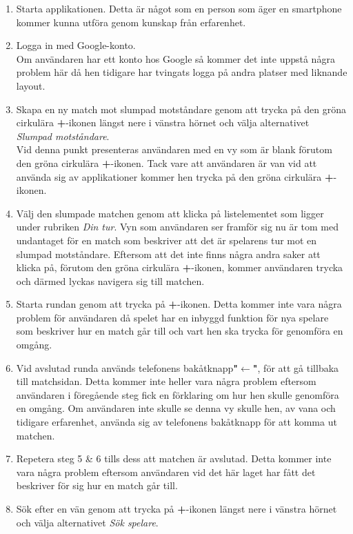 \documentclass[a4paper, 11pt]{article}
\begin{document}
\begin{enumerate}
\item Starta applikationen.
Detta är något som en person som äger en smartphone kommer kunna utföra genom kunskap från erfarenhet.
\item Logga in med Google-konto.\\ 
Om användaren har ett konto hos Google så kommer det inte uppstå några problem här då hen tidigare har tvingats logga på andra platser med liknande layout.
\item Skapa en ny match mot slumpad motståndare genom att trycka på den gröna cirkulära \textbf{+}-ikonen längst nere i vänstra hörnet och välja alternativet \textit{Slumpad motståndare}.\\
Vid denna punkt presenteras användaren med en vy som är blank förutom den gröna cirkulära \textbf{+}-ikonen. Tack vare att användaren är van vid att använda sig av applikationer kommer hen trycka på den gröna cirkulära \textbf{+}-ikonen.
\item Välj den slumpade matchen genom att klicka på listelementet som ligger under rubriken \textit{Din tur}.
Vyn som användaren ser framför sig nu är tom med undantaget för en match som beskriver att det är spelarens tur mot en slumpad motståndare. Eftersom att det inte finns några andra saker att klicka på, förutom den gröna cirkulära \textbf{+}-ikonen, kommer användaren trycka och därmed lyckas navigera sig till matchen.
\item Starta rundan genom att trycka på \textbf{+}-ikonen.
Detta kommer inte vara några problem för användaren då spelet har en inbyggd funktion för nya spelare som beskriver hur en match går till och vart hen ska trycka för genomföra en omgång.
\item Vid avslutad runda används telefonens bakåtknapp\textbf{"$\leftarrow$"}, för att gå tillbaka till matchsidan. Detta kommer inte heller vara några problem eftersom användaren i föregående steg fick en förklaring om hur hen skulle genomföra en omgång. Om användaren inte skulle se denna vy skulle hen, av vana och tidigare erfarenhet, använda sig av telefonens bakåtknapp för att komma ut matchen.
\item Repetera steg 5 \& 6 tills dess att matchen är avslutad.
Detta kommer inte vara några problem eftersom användaren vid det här laget har fått det beskriver för sig hur en match går till.
\item Sök efter en vän genom att trycka på \textbf{+}-ikonen längst nere i vänstra hörnet och välja alternativet \textit{Sök spelare}.\\

\end{enumerate}
\end{document}
